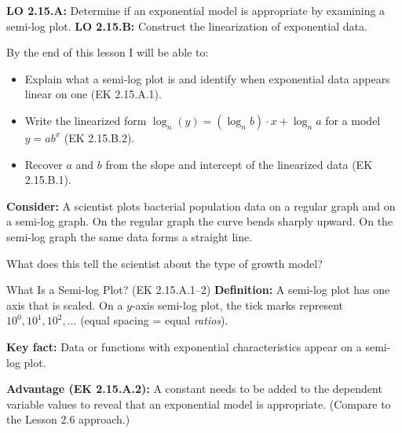 \documentclass[10pt]{article}
\begin{document}
\namedateperiod

\vspace{0.1in}

\begin{objectivebox}
\textbf{LO 2.15.A:} Determine if an exponential model is appropriate by examining a
semi-log plot. \quad \textbf{LO 2.15.B:} Construct the linearization of exponential data.

By the end of this lesson I will be able to:
\begin{itemize}[leftmargin=1.5em,itemsep=3pt,topsep=3pt]
  \item Explain what a semi-log plot is and identify when exponential data appears linear
        on one (EK 2.15.A.1).
  \item Write the linearized form $\log_n(y) = (\log_n b)\cdot x + \log_n a$ for a model
        $y = ab^x$ (EK 2.15.B.2).
  \item Recover $a$ and $b$ from the slope and intercept of the linearized data (EK 2.15.B.1).
\end{itemize}
\end{objectivebox}

\vspace{0.08in}

\begin{vocabbox}
\end{vocabbox}

\vspace{0.08in}

\begin{hookbox}
\textbf{Consider:} A scientist plots bacterial population data on a regular graph and on a
semi-log graph.  On the regular graph the curve bends sharply upward.  On the semi-log graph
the same data forms a straight line.

\vspace{4pt}
What does this tell the scientist about the type of growth model? \writeline
\end{hookbox}

\vspace{0.08in}

\begin{notesbox}{What Is a Semi-log Plot? (EK 2.15.A.1--2)}
\textbf{Definition:} A semi-log plot has one axis that is \blank{4cm} scaled.  On a
$y$-axis semi-log plot, the tick marks represent $10^0, 10^1, 10^2, \ldots$ (equal spacing
= equal \emph{ratios}).

\vspace{6pt}
\textbf{Key fact:} Data or functions with exponential characteristics appear
\blank{3cm} on a semi-log plot.

\vspace{6pt}
\textbf{Advantage (EK 2.15.A.2):} A constant \blank{3cm} needs to be added to
the dependent variable values to reveal that an exponential model is appropriate.
(Compare to the Lesson 2.6 approach.)
\end{notesbox}
\end{document}
